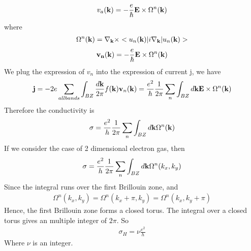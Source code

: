 \documentclass[a4paper]{article}
\begin{document}
\begin{align*}
	v_a({\bf k}) = -\frac{e}{\hbar} {\bf E} \times \Omega^{n}({\bf k})  
\end{align*}
where
\begin{align*}
	\Omega^{n}({\bf k}) = \nabla_{\bf k} \times <u_n({\bf k})|i\nabla_{\bf k}|u_n({\bf k})>
\end{align*}
\begin{align*}
	{\bf v_n}({\bf k}) = - \frac{e}{\hbar} {\bf E} \times \Omega^{n}({\bf k})
\end{align*}
We plug the expression of $v_n$ into the expression of current j, we have
\begin{align*}
	{\bf j} = -2e\sum_{all bands}\int_{BZ}\frac{d{\bf k}}{2 \pi} f({\bf k}){\bf v}_n({\bf k}) 
	 = \frac{e^2}{h} \frac{1}{2 \pi} \sum_n \int_{BZ} d{\bf k} {\bf E} \times \Omega^n({\bf k})
\end{align*}
Therefore the conductivity is
\begin{align*}
	\sigma = \frac{e^2}{h} \frac{1}{2 \pi} \sum_n \int_{BZ} d{\bf k} \Omega^n({\bf k})
\end{align*}
If we consider the case of 2 dimensional electron gas, then 
\begin{align*}
	\sigma = \frac{e^2}{h} \frac{1}{2 \pi} \sum_n \int_{BZ} d{\bf k} \Omega^n(k_x, k_y)
\end{align*}
Since the integral runs over the first Brillouin zone, and
\begin{align*}
	\Omega^n(k_x, k_y) = \Omega^n(k_x+\pi, k_y) = \Omega^n(k_x, k_y + \pi)
\end{align*}
Hence, the first Brillouin zone forms a closed torus. The integral over a closed torus gives an multiple integer of $2\pi$. So
\begin{align*}
	\sigma_H = \nu \frac{e^2}{h}
\end{align*}
Where $\nu$ is an integer.
\end{document}
